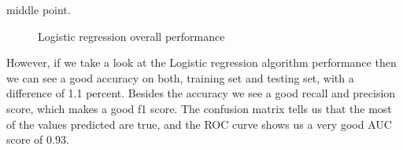 middle point.
\\[5pt]
\begin{figure}[H]
	\centering
	\hspace{5pt}
	\hspace{5pt}
	\caption{Logistic regression overall performance}
	\label{fig:lgs_perf}
\end{figure}
However, if we take a look at the Logistic regression algorithm performance then we can see
a good accuracy on both, training set and testing set, with a difference of 1.1 percent.
Besides the accuracy we see a good recall and precision score, which makes a good f1 score.
The confusion matrix tells us that the most of the values predicted are true, and the ROC curve
shows us a very good AUC score of 0.93.
